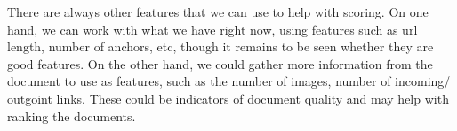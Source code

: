 \documentclass[10pt,twocolumn]{article}
\begin{document}
There are always other features that we can use to help with scoring. On one hand, we can work with what we have right now, using features such as url length, number of anchors, etc, though it remains to be seen whether they are good features.
On the other hand, we could gather more information from the document to use as features, such as the number of images, number of incoming/ outgoint links. These could be indicators of document quality and may help with ranking the documents. 
\end{document}
